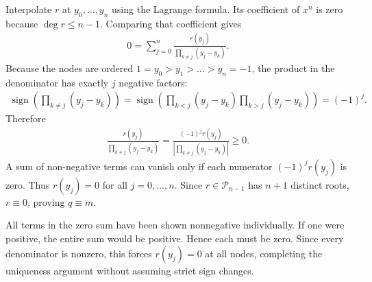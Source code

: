 \documentclass[../main.tex]{subfiles}
\begin{document}
{Interpolate $r$ at $y_0,\ldots,y_n$ using the Lagrange formula. Its coefficient of $x^n$ is zero because $\deg r\leq n-1$. Comparing that coefficient gives
\begin{align*}
    0
    =\sum_{j=0}^n\frac{r(y_j)}{\prod_{k\neq j}(y_j-y_k)}.
\end{align*}
Because the nodes are ordered $1 = y_0 > y_1 > \dots > y_n = -1$, the product in the denominator has exactly $j$ negative factors:
\begin{align*}
    \operatorname{sign}\left(\prod_{k\neq j}(y_j-y_k)\right)
    = \operatorname{sign}\left(\prod_{k<j}(y_j-y_k) \prod_{k>j}(y_j-y_k)\right)
    = (-1)^j.
\end{align*}
Therefore
\begin{align*}
    \frac{r(y_j)}{\prod_{k\neq j}(y_j-y_k)}
    = \frac{(-1)^j r(y_j)}{\left|\prod_{k\neq j}(y_j-y_k)\right|} \geq 0.
\end{align*}
A sum of non-negative terms can vanish only if each numerator $(-1)^j r(y_j)$ is zero. Thus $r(y_j) = 0$ for all $j = 0, \dots, n$. Since $r \in \mathcal{P}_{n-1}$ has $n+1$ distinct roots, $r \equiv 0$, proving $q \equiv m$.


All terms in the zero sum have been shown nonnegative individually. If one were positive, the entire sum would be positive. Hence each must be zero. Since every denominator is nonzero, this forces $r(y_j)=0$ at all nodes, completing the uniqueness argument without assuming strict sign changes.
}



\end{document}
